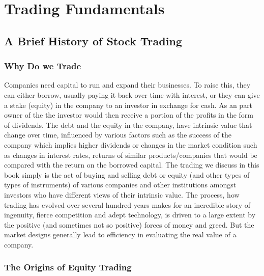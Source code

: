 \chapter{Trading Fundamentals}
\section{A Brief History of Stock Trading}
\subsection{Why Do we Trade}

Companies need capital to run and expand their businesses. To raise this, they can either borrow, usually paying it back over time with interest, or they can give a stake (equity) in the company to an investor in exchange for cash. As an part owner of the  the investor would then receive a portion of the profits in the form of dividends. The debt and the equity in the company,  have intrinsic value that change over time, influenced by various factors such as the success of the company which implies higher dividends or changes in the market condition such as changes in interest rates, returns of similar products/companies that would be compared with the return on the borrowed capital. The trading we discuss in this book simply is the act of buying and selling debt or equity (and other types of types of instruments) of various companies and other institutions amongst investors who have different views of their intrinsic value. The process, how trading has evolved over several hundred years makes for an incredible story of ingenuity, fierce competition and adept technology, is driven to a large extent by the positive (and sometimes not so positive) forces of money and greed. But the market designs generally lead to efficiency in evaluating the real value of a company. 


\subsection{The Origins of Equity Trading}


